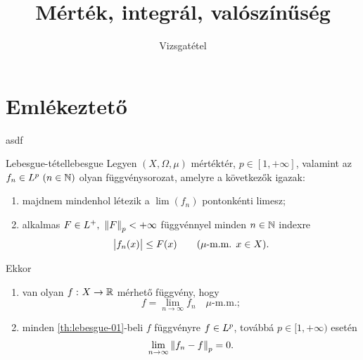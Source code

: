 \documentclass[
]{elteikthesis}[2024/04/26]
\title{Mérték, integrál, valószínűség} %
\subtitle{\circled{18} Vizsgatétel}
\begin{document}
	
	
	\section{Emlékeztető}
	
	asdf
	
	\begin{theorem}{Lebesgue-tétel}{lebesgue}
		Legyen \( (X, \Omega, \mu) \) mértéktér, \( p \in [1, +\infty] \), 
		valamint az \( f_n \in \Lebesgue[p] \ (n \in \N) \) olyan függvénysorozat, 
		amelyre a következők igazak:
		\begin{enumerate}[label=\roman*)]
			\item\label{eq:lebesgue-01}
			majdnem mindenhol létezik a \( \lim(f_n) \) pontonkénti limesz;
			
			\item\label{eq:lebesgue-02}
			alkalmas \( F \in L^+, \ \norm{F}_p < +\infty \) függvénnyel
			minden \( n \in \mathbb{N} \) indexre
			\[
				\abs\big{f_n(x)} \leq F(x) \qquad (\mu \text{-m.m. } x \in X).
			\]
		\end{enumerate}
		Ekkor
		\begin{enumerate}[label=\alph*)]
			\item\label{th:lebesgue-01}
			van olyan \( f \,\colon X \to \mathbb{R} \) mérhető függvény, hogy
			\[
				f = \lim_{n \to \infty} f_n \quad \mu \text{-m.m.};
			\]
			
			\item\label{th:lebesgue-02}
			minden \ref{th:lebesgue-01}-beli \( f \) függvényre \( f \in \Lebesgue[p] \), 
			továbbá \( p \in [1, +\infty) \) esetén
			\[
				\lim\limits_{n \to \infty} \norm{f_n - f}_p = 0.
			\]
		\end{enumerate}
	\end{theorem}
\end{document}
